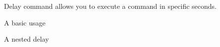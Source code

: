 Delay command allows you to execute a command in specific seconds.


\begin{example}{A basic usage}
\end{example}

\begin{example}{A nested delay}
\end{example}